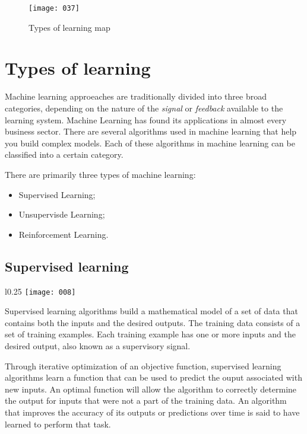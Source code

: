\begin{figure}[t!]
    \begin{center}
        \texttt{[image: 037]}
    \end{center}
    \caption{Types of learning map}
    \label{fig:037}
\end{figure}

\section{Types of learning}
Machine learning approeaches are traditionally divided into three broad categories, depending on the nature of the \emph{signal} or \emph{feedback} available to the learning system. Machine Learning has found its applications in almost every business sector. There are several algorithms used in machine learning that help you build complex models. Each of these algorithms in machine learning can be classified into a certain category.

There are primarily three types of machine learning:
\begin{itemize}[topsep={0pt}, partopsep={0pt}]
    \item Supervised Learning;
    \item Unsupervisde Learning;
    \item Reinforcement Learning.
\end{itemize}

\subsection{Supervised learning}
\begin{wrapfigure}{l}{0.25\textwidth}
      \texttt{[image: 008]}
\end{wrapfigure}
Supervised learning algorithms build a mathematical model of a set of data that contains both the inputs and the desired outputs. The training data consists of a set of training examples. Each training example has one or more inputs and the desired output, also known as a supervisory signal. 

Through iterative optimization of an objective function, supervised learning algorithms learn a function that can be used to predict the ouput associated with new inputs. An optimal function will allow the algorithm to correctly determine the output for inputs that were not a part of the training data. An algorithm that improves the accuracy of its outputs or predictions over time is said to have learned to perform that task.

